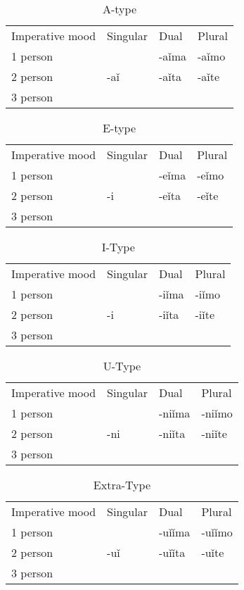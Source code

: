 \begin{table}[!htb]
	\caption{A-type}
	\begin{tabular}{llll}
		Imperative mood & Singular & Dual & Plural \\
		1 person &  & -aǐma & -aǐmo \\
		2 person & -aǐ & -aǐta & -aǐte \\
		3 person &  &  & 
	\end{tabular}
\end{table}



\begin{table}[!htb]
	\caption{E-type}
	\begin{tabular}{llll}
		Imperative mood & Singular & Dual & Plural \\
		1 person &  & -eǐma & -eǐmo \\
		2 person & -i & -eǐta & -eǐte \\
		3 person &  &  & 
	\end{tabular}
\end{table}



\begin{table}[!htb]
	\caption{I-Type}
	\begin{tabular}{llll}
		Imperative mood & Singular & Dual & Plural \\
		1 person &  & -iǐma & -iǐmo \\
		2 person & -i & -iǐta & -iǐte \\
		3 person &  &  & 
	\end{tabular}
\end{table}

\begin{table}[!htb]
	\caption{U-Type}
	\begin{tabular}{llll}
		Imperative mood & Singular & Dual & Plural \\
		1 person &  & -niǐma & -niǐmo \\
		2 person & -ni & -niǐta & -niǐte \\
		3 person &  &  & 
	\end{tabular}
\end{table}


\begin{table}[!htb]
	\caption{Extra-Type}
	\begin{tabular}{llll}
		Imperative mood & Singular & Dual & Plural \\
		1 person &  & -uǐǐma & -uǐǐmo \\
		2 person & -uǐ & -uǐǐta & -uǐte \\
		3 person &  &  & 
	\end{tabular}
\end{table}

